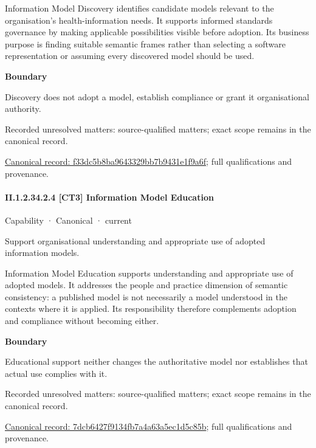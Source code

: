 Information Model Discovery identifies candidate models relevant to the organisation's health-information needs. It supports informed standards governance by making applicable possibilities visible before adoption. Its business purpose is finding suitable semantic frames rather than selecting a software representation or assuming every discovered model should be used.



\textbf{Boundary}



Discovery does not adopt a model, establish compliance or grant it organisational authority.


{\small Recorded unresolved matters: source-qualified matters; exact scope remains in the canonical record.}\par
{\footnotesize \href{../../../../continuum/strategy/capability/f33dc5b8ba9643329bb7b9431e1f9a6f.md}{Canonical record: f33dc5b8ba9643329bb7b9431e1f9a6f}; full qualifications and provenance.}\par
\paragraph*{II.1.2.34.2.4 [CT3] Information Model Education}
\label{navigation:II.1.2.34.2.4}

\label{element:7dcb6427f9134fb7a4a63a5ec1d5c85b}
{\small Capability · Canonical · current}\par

Support organisational understanding and appropriate use of adopted information models.



Information Model Education supports understanding and appropriate use of adopted models. It addresses the people and practice dimension of semantic consistency: a published model is not necessarily a model understood in the contexts where it is applied. Its responsibility therefore complements adoption and compliance without becoming either.



\textbf{Boundary}



Educational support neither changes the authoritative model nor establishes that actual use complies with it.


{\small Recorded unresolved matters: source-qualified matters; exact scope remains in the canonical record.}\par
{\footnotesize \href{../../../../continuum/strategy/capability/7dcb6427f9134fb7a4a63a5ec1d5c85b.md}{Canonical record: 7dcb6427f9134fb7a4a63a5ec1d5c85b}; full qualifications and provenance.}\par
